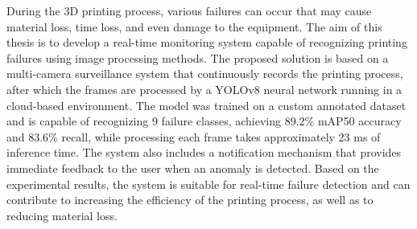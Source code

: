 During the 3D printing process, various failures can occur that may cause material loss, time loss, and even damage to the equipment.
The aim of this thesis is to develop a real-time monitoring system capable of recognizing printing failures using image processing methods.
The proposed solution is based on a multi-camera surveillance system that continuously records the printing process, after which the frames are
processed by a YOLOv8 neural network running in a cloud-based environment. The model was trained on a custom annotated dataset and is capable of
recognizing 9 failure classes, achieving 89.2\% mAP50 accuracy and 83.6\% recall, while processing each frame takes approximately 23 ms of inference time.
The system also includes a notification mechanism that provides immediate feedback to the user when an anomaly is detected.
Based on the experimental results, the system is suitable for real-time failure detection and can contribute to increasing the efficiency of the
printing process, as well as to reducing material loss.
